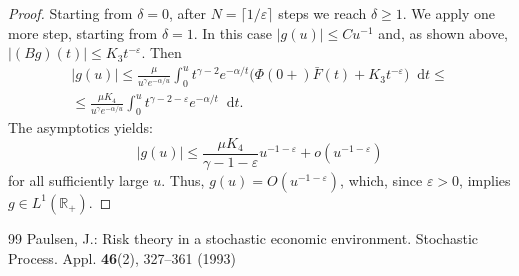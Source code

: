 \documentclass[10pt,a4paper]{amsart}
\providecommand{\diff}{\mathop{}\!\mathrm{d}}
\begin{document}
\begin{proof}
Starting from $\delta = 0$, after $N = \lceil 1/\varepsilon \rceil$ steps we reach $\delta \ge 1$. We apply one more step, starting from $\delta = 1$. In this case $|g(u)| \le C u^{-1}$ and, as shown above, $|(Bg)(t)| \le K_3 t^{-\varepsilon}$. Then
\begin{multline*}
|g(u)| \le \frac{\mu}{u^\gamma e^{-\alpha/u}} \int_0^u t^{\gamma-2} e^{-\alpha/t} \bigl( \Phi(0+)\bar F(t) + K_3 t^{-\varepsilon} \bigr) \diff t
\le
\\
\le \frac{\mu K_4}{u^\gamma e^{-\alpha/u}} \int_0^u t^{\gamma-2-\varepsilon} e^{-\alpha/t} \diff t.
\end{multline*}
The asymptotics yields:
\[
|g(u)| \le \frac{\mu K_4}{\gamma-1-\varepsilon} u^{-1-\varepsilon} + o(u^{-1-\varepsilon})
\]
for all sufficiently large $u$. Thus, $g(u) = O(u^{-1-\varepsilon})$, which, since $\varepsilon>0$, implies $g \in L^1(\mathbb{R}_+)$.
\end{proof}

\begin{thebibliography}{99}
 Paulsen, J.: Risk theory in a stochastic economic environment. Stochastic Process. Appl. \textbf{46}(2), 327--361 (1993)
\end{thebibliography}
\end{document}

